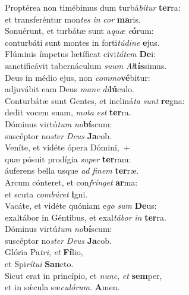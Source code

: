 \evenverse Proptérea non timébimus dum turbá\textit{bi}\textit{tur} \textbf{ter}ra:~\*\\
\evenverse et transferéntur mon\textit{tes} \textit{in} \textit{cor} \textbf{ma}ris.\\
\oddverse Sonuérunt, et turbátæ sunt a\textit{quæ} \textit{e}\textbf{ó}rum:~\*\\
\oddverse conturbáti sunt montes in forti\textit{tú}\textit{di}\textit{ne} \textbf{e}jus.\\
\evenverse Flúminis ímpetus lætíficat civi\textit{tá}\textit{tem} \textbf{De}i:~\*\\
\evenverse sanctificávit tabernáculum \textit{su}\textit{um} \textit{Al}\textbf{tís}simus.\\
\oddverse Deus in médio ejus, non \textit{com}\textit{mo}\textbf{vé}bitur:~\*\\
\oddverse adjuvábit eam Deus \textit{ma}\textit{ne} \textit{di}\textbf{lú}culo.\\
\evenverse Conturbátæ sunt Gentes, et incliná\textit{ta} \textit{sunt} \textbf{re}gna:~\*\\
\evenverse dedit vocem suam, \textit{mo}\textit{ta} \textit{est} \textbf{ter}ra.\\
\oddverse Dóminus virtú\textit{tum} \textit{no}\textbf{bí}scum:~\*\\
\oddverse suscéptor no\textit{ster} \textit{De}\textit{us} \textbf{Ja}cob.\\
\evenverse Veníte, et vidéte ópera Dómini,~+\\
\evenverse  quæ pósuit prodígia \textit{su}\textit{per} \textbf{ter}ram:~\*\\
\evenverse áuferens bella usque \textit{ad} \textit{fi}\textit{nem} \textbf{ter}ræ.\\
\oddverse Arcum cónteret, et con\textit{frín}\textit{get} \textbf{ar}ma:~\*\\
\oddverse et scuta \textit{com}\textit{bú}\textit{ret} \textbf{i}gni.\\
\evenverse Vacáte, et vidéte quóniam e\textit{go} \textit{sum} \textbf{De}us:~\*\\
\evenverse exaltábor in Géntibus, et exal\textit{tá}\textit{bor} \textit{in} \textbf{ter}ra.\\
\oddverse Dóminus virtú\textit{tum} \textit{no}\textbf{bí}scum:~\*\\
\oddverse suscéptor no\textit{ster} \textit{De}\textit{us} \textbf{Ja}cob.\\
\evenverse Glória Pa\textit{tri}, \textit{et} \textbf{Fí}lio,~\*\\
\evenverse et Spi\textit{rí}\textit{tu}\textit{i} \textbf{San}cto.\\
\oddverse Sicut erat in princípio, et \textit{nunc}, \textit{et} \textbf{sem}per,~\*\\
\oddverse et in sǽcula sæ\textit{cu}\textit{ló}\textit{rum}. \textbf{A}men.\\
